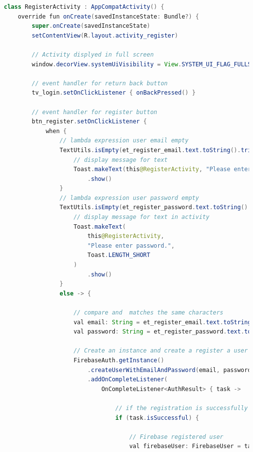 \begin{lstlisting}[language=Java, caption=Facebook Login /Sign up ]
class RegisterActivity : AppCompatActivity() {
    override fun onCreate(savedInstanceState: Bundle?) {
        super.onCreate(savedInstanceState)
        setContentView(R.layout.activity_register)

        // Activity displyed in full screen
        window.decorView.systemUiVisibility = View.SYSTEM_UI_FLAG_FULLSCREEN

        // event handler for return back button
        tv_login.setOnClickListener { onBackPressed() }

        // event handler for register button
        btn_register.setOnClickListener {
            when {
                // lambda expression user email empty
                TextUtils.isEmpty(et_register_email.text.toString().trim { it <= ' ' }) -> {
                    // display message for text
                    Toast.makeText(this@RegisterActivity, "Please enter email.", Toast.LENGTH_SHORT)
                        .show()
                }
                // lambda expression user password empty
                TextUtils.isEmpty(et_register_password.text.toString().trim { it <= ' ' }) -> {
                    // display message for text in activity
                    Toast.makeText(
                        this@RegisterActivity,
                        "Please enter password.",
                        Toast.LENGTH_SHORT
                    )
                        .show()
                }
                else -> {

                    // compare and  matches the same characters
                    val email: String = et_register_email.text.toString().trim { it <= ' ' }
                    val password: String = et_register_password.text.toString().trim { it <= ' ' }

                    // Create an instance and create a register a user with email and password.
                    FirebaseAuth.getInstance()
                        .createUserWithEmailAndPassword(email, password)
                        .addOnCompleteListener(
                            OnCompleteListener<AuthResult> { task ->

                                // if the registration is successfully done
                                if (task.isSuccessful) {

                                    // Firebase registered user
                                    val firebaseUser: FirebaseUser = task.result!!.user!!


\end{lstlisting}
